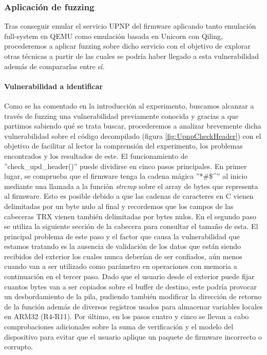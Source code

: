 \subsubsection{Aplicación de fuzzing}
Tras conseguir emular el servicio UPNP del firmware aplicando tanto emulación full-system en QEMU como emulación basada en Unicorn\cite{unicorn}
con Qiling\cite{qiling}, procederemos a aplicar fuzzing sobre dicho servicio con el objetivo de explorar otras técnicas a partir de las cuales 
se podría haber llegado a esta vulnerabilidad además de compararlas entre sí.

\paragraph{Vulnerabilidad a identificar} Como se ha comentado en la introducción al experimento, buscamos alcanzar a través de fuzzing una 
vulnerabilidad previamente conocida y gracias a que partimos sabiendo qué se trata buscar, procederemos a analizar brevemente dicha vulnerabilidad
sobre el código decompilado (figura \ref{fig:UpnpCheckHeader}) con el objetivo de facilitar al lector la comprensión del experimento, los problemas encontrados y los resultados de este. 
El funcionamiento de ''check\_upd\_header()'' puede dividirse en cinco pasos principales. En primer lugar, se comprueba que el firmware tenga 
la cadena mágica ''*\#\$\textasciicircum'' al inicio mediante una llamada a la función \textit{strcmp} sobre el array de bytes que representa al 
firmware. Esto es posible debido a que las cadenas de caracteres en C vienen delimitadas por un byte nulo al final y recordemos que los campos de 
las cabeceras TRX\cite{firmwareFormat} vienen también delimitadas por bytes nulos. En el segundo paso se utiliza la siguiente 
sección de la cabecera para consultar el tamaño de esta. El principal problema de este paso y el factor que causa la vulnerabilidad que estamos tratando
es la ausencia de validación de los datos que están siendo recibidos del exterior los cuales nunca deberían de ser confiados, aún menos cuando van a ser utilizado como parámetro en operaciones con memoria a continuación en el tercer paso. Dado que el usuario desde el exterior
puede fijar cuantos bytes van a ser copiados sobre el buffer de destino, este podría provocar un desbordamiento de la pila, pudiendo también modificar la 
dirección de retorno de la función además de diversos registros usados para almacenar variables locales en ARM32 (R4-R11). Por último, en los pasos 
cuatro y cinco se llevan a cabo comprobaciones adicionales sobre la suma de verificación y el modelo del dispositivo para evitar que el usuario aplique un paquete
de firmware incorrecto o corrupto.

